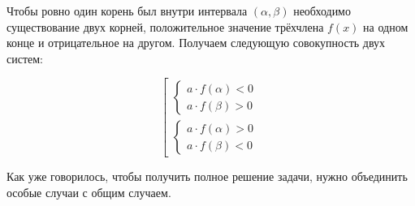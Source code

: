 Чтобы ровно один корень был внутри интервала $(\alpha, \beta)$ необходимо существование двух корней,
положительное значение трёхчлена $f(x)$ на одном конце и отрицательное на другом. Получаем
следующую совокупность двух систем:

\begin {equation*}
    \left[
        \begin {gathered}
            \begin {cases}
                a \cdot f(\alpha) < 0
                \\
                a \cdot f(\beta) > 0
            \end {cases}
            \\
            \begin {cases}
                a \cdot f(\alpha) > 0
                \\
                a \cdot f(\beta) < 0
            \end {cases}
        \end {gathered}
    \right.
\end {equation*}

Как уже говорилось, чтобы получить полное решение задачи, нужно объединить особые случаи с общим
случаем.
